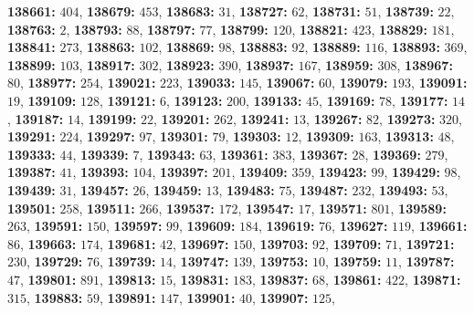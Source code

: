 \textsf{\bfseries 138661:} $404$, \textsf{\bfseries 138679:} $453$, \textsf{\bfseries 138683:} $31$, \textsf{\bfseries 138727:} $62$, \textsf{\bfseries 138731:} $51$, \textsf{\bfseries 138739:} $22$, \textsf{\bfseries 138763:} $2$, \textsf{\bfseries 138793:} $88$, \textsf{\bfseries 138797:} $77$, \textsf{\bfseries 138799:} $120$, \textsf{\bfseries 138821:} $423$, \textsf{\bfseries 138829:} $181$, \textsf{\bfseries 138841:} $273$, \textsf{\bfseries 138863:} $102$, \textsf{\bfseries 138869:} $98$, \textsf{\bfseries 138883:} $92$, \textsf{\bfseries 138889:} $116$, \textsf{\bfseries 138893:} $369$, \textsf{\bfseries 138899:} $103$, \textsf{\bfseries 138917:} $302$, \textsf{\bfseries 138923:} $390$, \textsf{\bfseries 138937:} $167$, \textsf{\bfseries 138959:} $308$, \textsf{\bfseries 138967:} $80$, \textsf{\bfseries 138977:} $254$, \textsf{\bfseries 139021:} $223$, \textsf{\bfseries 139033:} $145$, \textsf{\bfseries 139067:} $60$, \textsf{\bfseries 139079:} $193$, \textsf{\bfseries 139091:} $19$, \textsf{\bfseries 139109:} $128$, \textsf{\bfseries 139121:} $6$, \textsf{\bfseries 139123:} $200$, \textsf{\bfseries 139133:} $45$, \textsf{\bfseries 139169:} $78$, \textsf{\bfseries 139177:} $14$, \textsf{\bfseries 139187:} $14$, \textsf{\bfseries 139199:} $22$, \textsf{\bfseries 139201:} $262$, \textsf{\bfseries 139241:} $13$, \textsf{\bfseries 139267:} $82$, \textsf{\bfseries 139273:} $320$, \textsf{\bfseries 139291:} $224$, \textsf{\bfseries 139297:} $97$, \textsf{\bfseries 139301:} $79$, \textsf{\bfseries 139303:} $12$, \textsf{\bfseries 139309:} $163$, \textsf{\bfseries 139313:} $48$, \textsf{\bfseries 139333:} $44$, \textsf{\bfseries 139339:} $7$, \textsf{\bfseries 139343:} $63$, \textsf{\bfseries 139361:} $383$, \textsf{\bfseries 139367:} $28$, \textsf{\bfseries 139369:} $279$, \textsf{\bfseries 139387:} $41$, \textsf{\bfseries 139393:} $104$, \textsf{\bfseries 139397:} $201$, \textsf{\bfseries 139409:} $359$, \textsf{\bfseries 139423:} $99$, \textsf{\bfseries 139429:} $98$, \textsf{\bfseries 139439:} $31$, \textsf{\bfseries 139457:} $26$, \textsf{\bfseries 139459:} $13$, \textsf{\bfseries 139483:} $75$, \textsf{\bfseries 139487:} $232$, \textsf{\bfseries 139493:} $53$, \textsf{\bfseries 139501:} $258$, \textsf{\bfseries 139511:} $266$, \textsf{\bfseries 139537:} $172$, \textsf{\bfseries 139547:} $17$, \textsf{\bfseries 139571:} $801$, \textsf{\bfseries 139589:} $263$, \textsf{\bfseries 139591:} $150$, \textsf{\bfseries 139597:} $99$, \textsf{\bfseries 139609:} $184$, \textsf{\bfseries 139619:} $76$, \textsf{\bfseries 139627:} $119$, \textsf{\bfseries 139661:} $86$, \textsf{\bfseries 139663:} $174$, \textsf{\bfseries 139681:} $42$, \textsf{\bfseries 139697:} $150$, \textsf{\bfseries 139703:} $92$, \textsf{\bfseries 139709:} $71$, \textsf{\bfseries 139721:} $230$, \textsf{\bfseries 139729:} $76$, \textsf{\bfseries 139739:} $14$, \textsf{\bfseries 139747:} $139$, \textsf{\bfseries 139753:} $10$, \textsf{\bfseries 139759:} $11$, \textsf{\bfseries 139787:} $47$, \textsf{\bfseries 139801:} $891$, \textsf{\bfseries 139813:} $15$, \textsf{\bfseries 139831:} $183$, \textsf{\bfseries 139837:} $68$, \textsf{\bfseries 139861:} $422$, \textsf{\bfseries 139871:} $315$, \textsf{\bfseries 139883:} $59$, \textsf{\bfseries 139891:} $147$, \textsf{\bfseries 139901:} $40$, \textsf{\bfseries 139907:} $125$, 
